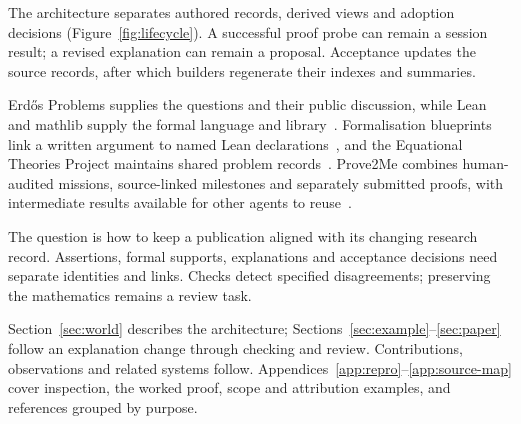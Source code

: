 \documentclass[10pt]{article}
\begin{document}
The architecture separates authored records, derived views and adoption decisions (Figure~\ref{fig:lifecycle}). A successful proof probe can remain a session result; a revised explanation can remain a proposal. Acceptance updates the source records, after which builders regenerate their indexes and summaries.

Erd\H{o}s Problems supplies the questions and their public discussion, while Lean and mathlib supply the formal language and library~\cite{erdosproblems,lean4,mathlib}.
Formalisation blueprints link a written argument to named Lean declarations~\cite{leanblueprint,leanarchitect}, and the Equational Theories Project maintains shared problem records~\cite{etp}. Prove2Me combines human-audited missions, source-linked milestones and separately submitted proofs, with intermediate results available for other agents to reuse~\cite[Sections~3--4]{prove2me}.

The question is how to keep a publication aligned with its changing research record. Assertions, formal supports, explanations and acceptance decisions need separate identities and links. Checks detect specified disagreements; preserving the mathematics remains a review task.

Section~\ref{sec:world} describes the architecture; Sections~\ref{sec:example}--\ref{sec:paper} follow an explanation change through checking and review. Contributions, observations and related systems follow. Appendices~\ref{app:repro}--\ref{app:source-map} cover inspection, the worked proof, scope and attribution examples, and references grouped by purpose.
\end{document}
